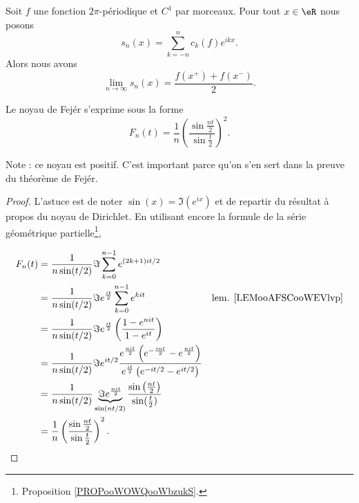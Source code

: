 \begin{theorem}
	Soit \( f\) une fonction \( 2\pi\)-périodique et \( C^1\) par morceaux. Pour tout \( x\in \eR\) nous posons
	\begin{equation}
		s_n(x)=\sum_{k=-n}^nc_k(f) e^{ikx}.
	\end{equation}
	Alors nous avons
	\begin{equation}
		\lim_{n\to \infty} s_n(x)=\frac{ f(x^+)+f(x^-) }{ 2 }.
	\end{equation}
\end{theorem}

\begin{lemma}   \label{LemtCAjJz}
	Le noyau de Fejér s'exprime sous la forme
	\begin{equation}    \label{EqLOtzCf}
		F_n(t)=\frac{1}{ n }\left( \frac{ \sin\frac{ nt }{2} }{ \sin\frac{ t }{2} } \right)^2.
	\end{equation}
\end{lemma}
Note : ce noyau est positif. C'est important parce qu'on s'en sert dans la preuve du théorème de Fejér.

\begin{proof}
	L'astuce est de noter \( \sin(x)=\Im( e^{ix})\) et de repartir du résultat à propos du noyau de Dirichlet. En utilisant encore la formule de la série géométrique partielle\footnote{Proposition \ref{PROPooWOWQooWbzukS}.},

	\begin{subequations}
		\begin{align}
			F_n(t) & =\frac{1}{ n\sin(t/2) }\Im\sum_{k=0}^{n-1} e^{(2k+1)it/2}                                                                                                                                                                 \\
			       & =\frac{1}{ n\sin(t/2) }\Im e^{\frac{ it }{ 2 }}\sum_{k=0}^{n-1}e^{kit}                                                                                                              & \text{lem. \ref{LEMooAFSCooWEVlvp}} \\
			       & =\frac{1}{ n\sin(t/2) }\Im e^{\frac{ it }{ 2 }}\left( \frac{ 1- e^{nit} }{ 1- e^{it} } \right)                                                                                                                            \\
			       & =\frac{1}{ n\sin(t/2) }\Im e^{it/2}\frac{ e^{\frac{ nit }{ 2 }}\left( e^{-\frac{ int }{2}}- e^{\frac{ nit }{2}} \right) }{  e^{\frac{ it }{2}}\left(  e^{-it/2}- e^{it/2} \right) }                                       \\
			       & =\frac{1}{ n\sin(t/2) }\underbrace{\Im e^{\frac{ nit }{2}}}_{\sin(nt/2)}\frac{ \sin\left( \frac{ nt }{ 2 } \right) }{ \sin(\frac{ t }{2}) }                                                                               \\
			       & =\frac{1}{ n }\left( \frac{ \sin\frac{ nt }{2} }{ \sin\frac{ t }{2} } \right)^2.
		\end{align}
	\end{subequations}
\end{proof}

